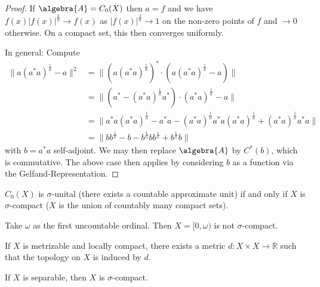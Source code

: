 \documentclass[a4paper]{article}
\begin{document}
\begin{proof}
	If $\algebra{A} = C_0(X)$ then $a = f$ and we have $f(x) |f(x)|^{\frac{2}{n}} \to f(x)$ as $|f(x)|^{\frac{2}{n}} \to 1$ on the non-zero points of $f$ and $\to 0$ otherwise.
	On a compact set, this then converges uniformly.

	In general: Compute
	\begin{align*}
		\|a (a^* a)^{\frac{1}{n}} - a\|^2 
		&= \| (a (a^* a)^\frac{1}{n})^* \cdot (a (a^* a)^\frac{1}{n} - a) \|\\
		&= \|(a^* - (a^* a)^\frac{1}{n} a^*) \cdot (a^* a)^\frac{1}{n} - a \|\\
		&= \|a^* a (a^* a)^\frac{1}{n} - a^* a - (a^* a)^\frac{1}{n} a^*a (a^* a)^\frac{1}{n} + (a^*a)^\frac{1}{n} a^* a \|\\
		&= \| b b^\frac{1}{n} - b - b^\frac{1}{n} b b^\frac{1}{n} + b^\frac{1}{n} b \|
	\end{align*}
	with $b = a^* a$ self-adjoint. We may then replace $\algebra{A}$ by $C^*(b)$, which is commutative.
	The above case then applies by considering $b$ as a function via the Gelfand-Representation.
\end{proof}

\begin{exercise}[04-10]
	$C_0(X)$ is $\sigma$-unital (there exists a countable approximate unit) if and only if $X$ is $\sigma$-compact ($X$ is the union of countably many compact sets).
\end{exercise}

\begin{example}
	Take $\omega$ as the first uncountable ordinal.
	Then $X = [0, \omega)$ is not $\sigma$-compact.

	If $X$ is metrizable and locally compact, there exists a metric $d: X \times X \to \mathds{R}$ such that the topology on $X$ is induced by $d$.

	If $X$ is separable, then $X$ is $\sigma$-compact.
\end{example}
\end{document}
